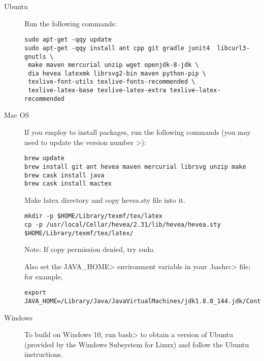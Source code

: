 \begin{description}
\item[Ubuntu]
  Run the following commands:

\begin{Verbatim}
sudo apt-get -qqy update
sudo apt-get -qqy install ant cpp git gradle junit4  libcurl3-gnutls \
 make maven mercurial unzip wget openjdk-8-jdk \
 dia hevea latexmk librsvg2-bin maven python-pip \
 texlive-font-utils texlive-fonts-recommended \
 texlive-latex-base texlive-latex-extra texlive-latex-recommended

\end{Verbatim}


\item[Mac OS]
  If you employ  to install packages, run
  the following commands (you may need to update the version number >):

\begin{Verbatim}
brew update
brew install git ant hevea maven mercurial librsvg unzip make
brew cask install java
brew cask install mactex
\end{Verbatim}

Make latex directory and copy hevea.sty file into it.

\begin{Verbatim}
mkdir -p $HOME/Library/texmf/tex/latex
cp -p /usr/local/Cellar/hevea/2.31/lib/hevea/hevea.sty $HOME/Library/texmf/tex/latex/
\end{Verbatim}

Note: If copy permission denied, try sudo.

Also set the \<JAVA\_HOME> environment variable in your \<.bashrc> file;
for example,

\begin{Verbatim}
export JAVA_HOME=/Library/Java/JavaVirtualMachines/jdk1.8.0_144.jdk/Contents/Home
\end{Verbatim}


\item[Windows]
  To build on Windows 10,
  run \<bash> to obtain a version of
  Ubuntu (provided by the Windows Subsystem for Linux) and follow the Ubuntu
  instructions.


\end{description}


